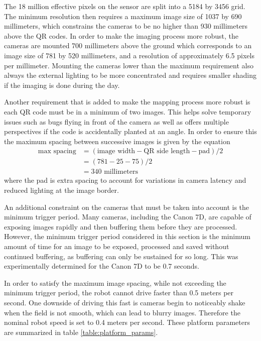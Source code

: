 The 18 million effective pixels on the sensor are split into a 5184 by 3456 grid.  The minimum resolution then requires a maximum image size of 1037 by 690 millimeters, which constrains the cameras to be no higher than 930 millimeters above the QR codes.  In order to make the imaging process more robust, the cameras are mounted 700 millimeters above the ground which corresponds to an image size of 781 by 520 millimeters, and a resolution of approximately 6.5 pixels per millimeter.  Mounting the cameras lower than the maximum requirement also always the external lighting to be more concentrated and requires smaller shading if the imaging is done during the day.  

Another requirement that is added to make the mapping process more robust is each QR code must be in a minimum of two images.  This helps solve temporary issues such as bugs flying in front of the camera as well as offers multiple perspectives if the code is accidentally planted at an angle.  In order to ensure this the maximum spacing between successive images is given by the equation
\begin{align*}
 \text{max spacing} &= (\text{image width} - \text{QR side length} - \text{pad}) / 2 \\
             &= (781 - 25 - 75) / 2 \\ 
             &= 340 \text{ millimeters}
\end{align*}
where the pad is extra spacing to account for variations in camera latency and reduced lighting at the image border.
  
An additional constraint on the cameras that must be taken into account is the minimum trigger period.  Many cameras, including the Canon 7D, are capable of exposing images rapidly and then buffering them before they are processed.  However, the minimum trigger period considered in this section is the minimum amount of time for an image to be exposed, processed and saved without continued buffering, as buffering can only be sustained for so long.  This was experimentally determined for the Canon 7D to be 0.7 seconds.  

In order to satisfy the maximum image spacing, while not exceeding the minimum trigger period, the robot cannot drive faster than 0.5 meters per second.  One downside of driving this fast is cameras begin to noticeably shake when the field is not smooth, which can lead to blurry images.  Therefore the nominal robot speed is set to 0.4 meters per second.  These platform parameters are summarized in table \ref{table:platform_params}.

